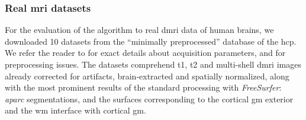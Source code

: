 \subsubsection{Real \gls{mri} datasets} %
\label{sec:human_connectome}
%
For the evaluation of the algorithm to real \gls*{dmri} data of human brains,
  we downloaded 10 datasets from the ``minimally preprocessed''
	 database of the \gls*{hcp}.
We refer the reader to \citep{essen_human_2012} for exact details about acquisition
  parameters, and \citep{glasser_minimal_2013} for preprocessing issues.
The datasets comprehend \gls*{t1}, \gls*{t2} and multi-shell \gls*{dmri} images
  already corrected for artifacts, brain-extracted and spatially normalized,
  along with the most prominent results of the standard processing with
  \emph{FreeSurfer}: \emph{aparc} segmentations, and the surfaces corresponding to
  the cortical \gls*{gm} exterior and the \gls*{wm} interface with
  cortical \gls*{gm}.

